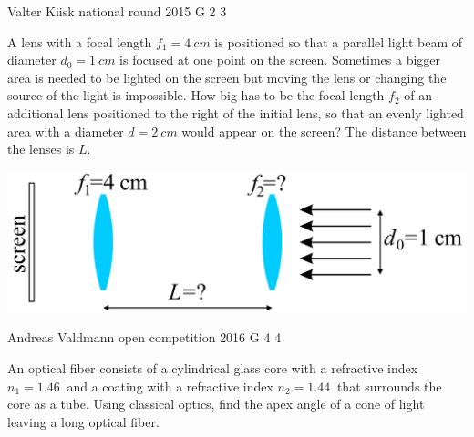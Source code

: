 \documentclass[11pt]{article}
\begin{document}
{Valter Kiisk} %
{national round} %
{2015} %
{G 2} %
{3} %
{

\ifEngStatement
A lens with a focal length $f_1=\SI{4}{cm}$ is positioned so that a parallel light beam of diameter $d_0=\SI{1}{cm}$ is focused at one point on the screen. Sometimes a bigger area is needed to be lighted on the screen but moving the lens or changing the source of the light is impossible. How big has to be the focal length $f_2$ of an additional lens positioned to the right of the initial lens, so that an evenly lighted area with a diameter $d=\SI{2}{cm}$ would appear on the screen? The distance between the lenses is $L$.
\begin{center}
\includegraphics[scale=1.5]{2015-v3g-02-valgustamine-yles_ing}
\end{center}
\fi
}

{Andreas Valdmann} %
{open competition} %
{2016} %
{G 4} %
{4} %
{

\ifEngStatement
An optical fiber consists of a cylindrical glass core with a refractive index $n_1=\SI{1,46}{}$ and a coating with a refractive index $n_2=\SI{1,44}{}$ that surrounds the core as a tube. Using classical optics, find the apex angle of a cone of light leaving a long optical fiber.
\fi
}
\end{document}
